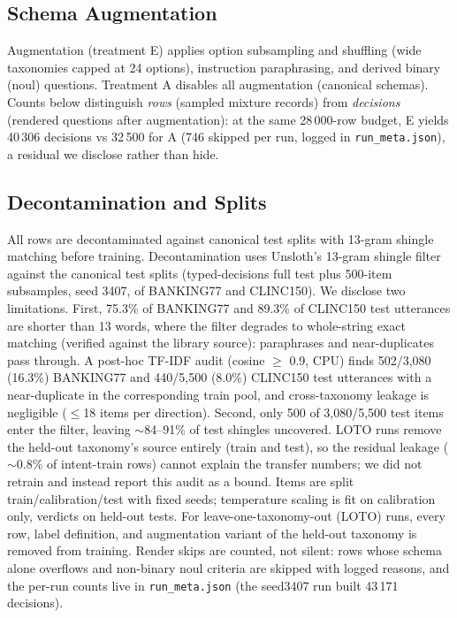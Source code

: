 \subsection{Schema Augmentation}
Augmentation (treatment E) applies option subsampling and shuffling (wide
taxonomies capped at 24 options), instruction paraphrasing, and derived binary
(noul) questions. Treatment A disables all augmentation (canonical schemas).
Counts below distinguish \textit{rows} (sampled mixture records) from
\textit{decisions} (rendered questions after augmentation): at the same
28\,000-row budget, E yields 40\,306 decisions vs 32\,500 for A (746 skipped
per run, logged in \texttt{run\_meta.json}), a residual we disclose rather
than hide.

\subsection{Decontamination and Splits}
All rows are decontaminated against canonical test splits with 13-gram shingle
matching before training. Decontamination uses Unsloth's 13-gram shingle
filter against the canonical test splits (typed-decisions full test plus
500-item subsamples, seed 3407, of BANKING77 and CLINC150). We disclose two
limitations. First, 75.3\% of BANKING77 and 89.3\% of CLINC150 test
utterances are shorter than 13 words, where the filter degrades to
whole-string exact matching (verified against the library source):
paraphrases and near-duplicates pass through. A post-hoc TF-IDF audit
(cosine $\geq$ 0.9, CPU) finds 502/3,080 (16.3\%) BANKING77 and 440/5,500
(8.0\%) CLINC150 test utterances with a near-duplicate in the corresponding
train pool, and cross-taxonomy leakage is negligible ($\leq$18 items per
direction). Second, only 500 of 3,080/5,500 test items enter the filter,
leaving $\sim$84--91\% of test shingles uncovered. LOTO runs remove the
held-out taxonomy's source entirely (train and test), so the residual leakage
($\sim$0.8\% of intent-train rows) cannot explain the transfer numbers; we
did not retrain and instead report this audit as a bound. Items are split train/calibration/test with fixed
seeds; temperature scaling is fit on calibration only, verdicts on held-out
tests. For leave-one-taxonomy-out (LOTO) runs, every row, label definition, and
augmentation variant of the held-out taxonomy is removed from training. Render skips are counted, not silent:
rows whose schema alone overflows and non-binary noul criteria are skipped
with logged reasons, and the per-run counts live in \texttt{run\_meta.json}
(the seed3407 run built 43\,171 decisions).
